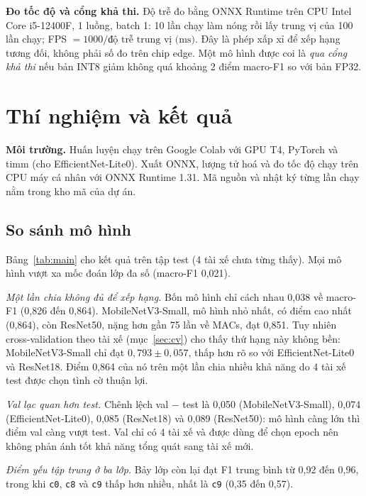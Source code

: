 \documentclass[10pt,a4paper,twocolumn]{article}
\newcommand{\cls}[1]{\texttt{#1}}
\begin{document}
\textbf{Đo tốc độ và cổng khả thi.} Độ trễ đo bằng ONNX Runtime trên CPU Intel Core i5-12400F, 1 luồng, batch 1: 10 lần chạy làm nóng rồi lấy trung vị của 100 lần chạy; FPS $=1000/\text{độ trễ trung vị (ms)}$. Đây là phép xấp xỉ để xếp hạng tương đối, không phải số đo trên chip edge. Một mô hình được coi là \emph{qua cổng khả thi} nếu bản INT8 giảm không quá khoảng 2 điểm macro-F1 so với bản FP32.

\section{Thí nghiệm và kết quả}
\textbf{Môi trường.} Huấn luyện chạy trên Google Colab với GPU T4, PyTorch và timm (cho EfficientNet-Lite0). Xuất ONNX, lượng tử hoá và đo tốc độ chạy trên CPU máy cá nhân với ONNX Runtime 1.31. Mã nguồn và nhật ký từng lần chạy nằm trong kho mã của dự án.

\subsection{So sánh mô hình}
Bảng~\ref{tab:main} cho kết quả trên tập test (4 tài xế chưa từng thấy). Mọi mô hình vượt xa mốc đoán lớp đa số (macro-F1 0,021).

\emph{Một lần chia không đủ để xếp hạng.} Bốn mô hình chỉ cách nhau 0,038 về macro-F1 (0,826 đến 0,864). MobileNetV3-Small, mô hình nhỏ nhất, có điểm cao nhất (0,864), còn ResNet50, nặng hơn gần 75 lần về MACs, đạt 0,851. Tuy nhiên cross-validation theo tài xế (mục~\ref{sec:cv}) cho thấy thứ hạng này không bền: MobileNetV3-Small chỉ đạt $0{,}793 \pm 0{,}057$, thấp hơn rõ so với EfficientNet-Lite0 và ResNet18. Điểm 0,864 của nó trên một lần chia nhiều khả năng do 4 tài xế test được chọn tình cờ thuận lợi.

\emph{Val lạc quan hơn test.} Chênh lệch val $-$ test là 0,050 (MobileNetV3-Small), 0,074 (EfficientNet-Lite0), 0,085 (ResNet18) và 0,089 (ResNet50): mô hình càng lớn thì điểm val càng vượt test. Val chỉ có 4 tài xế và được dùng để chọn epoch nên không phản ánh tốt khả năng tổng quát sang tài xế mới.

\emph{Điểm yếu tập trung ở ba lớp.} Bảy lớp còn lại đạt F1 trung bình từ 0,92 đến 0,96, trong khi \cls{c0}, \cls{c8} và \cls{c9} thấp hơn nhiều, nhất là \cls{c9} (0,35 đến 0,57).
\end{document}
